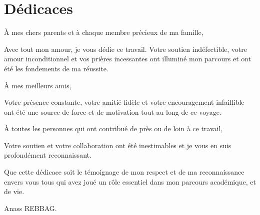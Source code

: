 \chapter*{Dédicaces}

  \begin{dedication}
  
    À mes chers parents et à chaque membre précieux de ma famille,

Avec tout mon amour, je vous dédie ce travail. Votre soutien indéfectible, votre amour inconditionnel et vos prières incessantes ont illuminé mon parcours et ont été les fondements de ma réussite.

    \vspace{1\baselineskip}
À mes meilleurs amis,

Votre présence constante, votre amitié fidèle et votre encouragement infaillible ont été une source de force et de motivation tout au long de ce voyage.

À toutes les personnes qui ont contribué de près ou de loin à ce travail,

Votre soutien et votre collaboration ont été inestimables et je vous en suis profondément reconnaissant.

Que cette dédicace soit le témoignage de mon respect et de ma reconnaissance envers vous tous qui avez joué un rôle essentiel dans mon parcours académique, et de vie.
    
    \par   %


    \vspace{\baselineskip}
     Anass REBBAG.
  \end{dedication}


